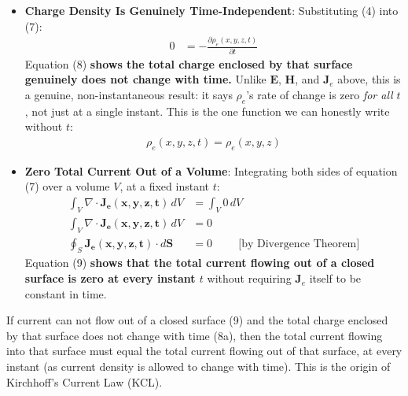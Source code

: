 \begin{enumerate}
    \begin{itemize}
      \item \textbf{Charge Density Is Genuinely Time-Independent}:
        Substituting (4) into (7):
        \begin{align*}
          0 &= -\frac{\partial \rho_e(x,y,z,t)}{\partial t} \tag{8}
        \end{align*}
        Equation (8) \textbf{shows the total charge enclosed by that
        surface genuinely does not change with time.} Unlike
        \(\mathbf{E}\), \(\mathbf{H}\), and \(\mathbf{J}_e\) above,
        this is a genuine, non-instantaneous result: it says
        \(\rho_e\)'s rate of change is zero \emph{for all} \(t\), not
        just at a single instant. This is the one function we can
        honestly write without \(t\):
        \begin{align*}
          \rho_e(x,y,z,t) = \rho_e(x,y,z) \tag{8a}
        \end{align*}
      \item \textbf{Zero Total Current Out of a Volume}: Integrating
        both sides of equation (7) over a volume \(V\), at a fixed
        instant \(t\):
        \begin{align*}
          \int_V \nabla \cdot \mathbf{J_e(x,y,z,t)} \, dV &= \int_V 0 \, dV \\
          \int_V \nabla \cdot \mathbf{J_e(x,y,z,t)} \, dV &= 0 \\
          \oint_S \mathbf{J_e(x,y,z,t)} \cdot d\mathbf{S} &= 0 \hspace{1cm} \text{[by Divergence Theorem]} \tag{9}
        \end{align*}
        Equation (9) \textbf{shows that the total current flowing out of a
        closed surface is zero at every instant \(t\)} without requiring
        \(\mathbf{J}_e\) itself to be constant in time.
    \end{itemize}
    If current can not flow out of a closed surface (9) and the total charge
    enclosed by that surface does not change with time (8a), then the total
    current flowing into that surface must equal the total current flowing
    out of that surface, at every instant (as current density is allowed to
    change with time). This is the origin of Kirchhoff's Current Law (KCL).
\end{enumerate}

